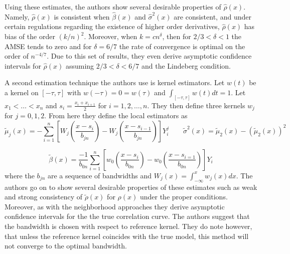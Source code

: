 \documentclass[12pt]{article}  %
\begin{document}
Using these estimates, the authors show several desirable properties of $\hat{\rho}(x)$. Namely, $\hat{\rho}(x)$ is consistent when $\hat{\beta}(x)$ and $\hat{\sigma}^2(x)$ are consistent, and under certain regulations regarding the existence of higher order derivatives, $\hat{\rho}(x)$ has bias of the order $(k/n)^2$. Moreover, when $k = cn^{\delta}$, then for $2/3 < \delta <1$ the AMSE tends to zero and for $\delta = 6/7$ the rate of convergence is optimal on the order of $n^{-4/7}$. Due to this set of results, they even derive asymptotic confidence intervals for $\hat{\rho}(x)$ assuming $2/3<\delta<6/7$ and the Lindeberg condition. 

A second estimation technique the authors use is kernel estimators. Let $w(t)$ be a kernel on $[-\tau, \tau]$ with $w(-\tau) = 0 = w(\tau)$ and $\int_{[-\tau, \tau]}w(t)dt = 1$. Let $x_1<\ldots<x_n$ and $s_i =\frac{x_i + x_{i+1}}{2}$ for $i=1,2,\ldots,n$. They then define three kernels $w_j$ for $j = 0,1,2$. From here they define the local estimators as 
$$\tilde{\mu}_j(x) = -\sum_{i=1}^n\left[W_j\left(\frac{x-s_i}{b_{jn}}\right) - W_j\left(\frac{x-s_{i-1}}{b_{jn}}\right)\right]Y_i^j\hspace{2em}\tilde{\sigma}^2(x) = \tilde{\mu}_2(x) - (\tilde{\mu}_2(x))^2$$

$$\tilde{\beta}(x) = \frac{-1}{b_{0n}}\sum_{i=1}^n\left[w_0\left(\frac{x-s_i}{b_{0n}}\right) - w_0\left(\frac{x-s_{i=1}}{b_{0n}}\right)\right]Y_i$$
where the $b_{jn}$ are a sequence of bandwidths and $W_j(x) = \int_{-\infty}^{x}w_j(x)dx$. The authors go on to show several desirable properties of these estimates such as weak and strong consistency of $\tilde{\rho}(x)$ for $\rho(x)$ under the proper conditions. Moreover, as with the neighborhood approaches they derive asymptotic confidence intervals for the the true correlation curve. The authors suggest that the bandwidth is chosen with respect to reference kernel. They do note however, that unless the reference kernel coincides with the true model, this method will not converge to the optimal bandwidth. 
\end{document}
